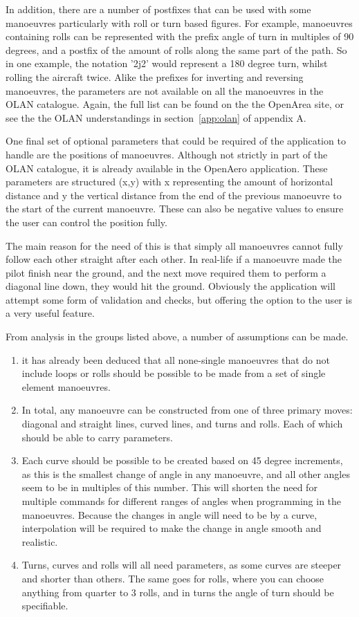 In addition, there are a number of postfixes that can be used with some manoeuvres particularly with roll or turn based figures. For example, manoeuvres containing rolls can be represented with the prefix angle of turn in multiples of 90 degrees, and a postfix of the amount of rolls along the same part of the path. So in one example, the notation '2j2' would represent a 180 degree turn, whilst rolling the aircraft twice. Alike the prefixes for inverting and reversing manoeuvres, the parameters are not available on all the manoeuvres in the OLAN catalogue. Again, the full list can be found on the the OpenArea site, or see the the OLAN understandings in section~\ref{app:olan} of appendix A.

One final set of optional parameters that could be required of the application to handle are the positions of manoeuvres. Although not strictly in part of the OLAN catalogue, it is already available in the OpenAero application. These parameters are structured (x,y) with x representing the amount of horizontal distance and y the vertical distance from the end of the previous manoeuvre to the start of the current manoeuvre. These can also be negative values to ensure the user can control the position fully. 

The main reason for the need of this is that simply all manoeuvres cannot fully follow each other straight after each other. In real-life if a manoeuvre made the pilot finish near the ground, and the next move required them to perform a diagonal line down, they would hit the ground. Obviously the application will attempt some form of validation and checks, but offering the option to the user is a very useful feature.

From analysis in the groups listed above, a number of assumptions can be made.
\begin{enumerate}
	\item it has already been deduced that all none-single manoeuvres that do not include loops or rolls should be possible to be made from a set of single element manoeuvres.
	\item In total, any manoeuvre can be constructed from one of three primary moves: diagonal and straight lines, curved lines, and turns and rolls. Each of which should be able to carry parameters.
	\item Each curve should be possible to be created based on 45 degree increments, as this is the smallest change of angle in any manoeuvre, and all other angles seem to be in multiples of this number. This will shorten the need for multiple commands for different ranges of angles when programming in the manoeuvres. Because the changes in angle will need to be by a curve, interpolation will be required to make the change in angle smooth and realistic.
	\item Turns, curves and rolls will all need parameters, as some curves are steeper and shorter than others. The same goes for rolls, where you can choose anything from quarter to 3 rolls, and in turns the angle of turn should be specifiable.
\end{enumerate}

